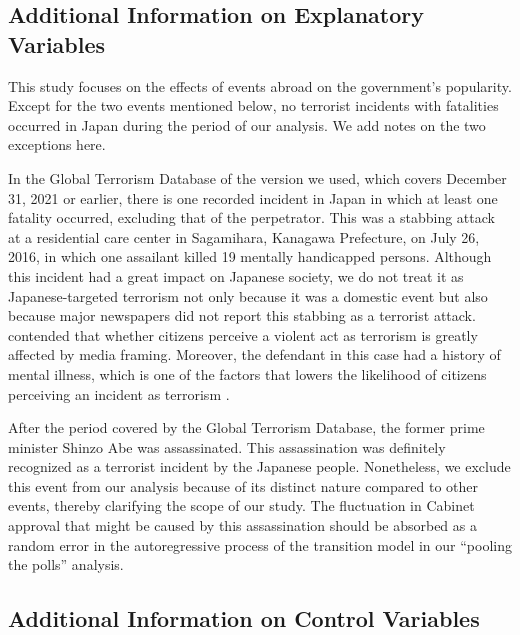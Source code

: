 \documentclass[12pt,letterpaper]{scrartcl}
\begin{document}

\normalsize
\doublespacing
\subsection{Additional Information on Explanatory Variables}\label{app:subsec:terrorism}

This study focuses on the effects of events abroad on the government's popularity. Except for the two events mentioned below, no terrorist incidents with fatalities occurred in Japan during the period of our analysis. We add notes on the two exceptions here.

In the Global Terrorism Database of the version we used, which covers December 31, 2021 or earlier, there is one recorded incident in Japan in which at least one fatality occurred, excluding that of the perpetrator. This was a stabbing attack at a residential care center in Sagamihara, Kanagawa Prefecture, on July 26, 2016, in which one assailant killed 19 mentally handicapped persons. Although this incident had a great impact on Japanese society, we do not treat it as Japanese-targeted terrorism not only because it was a domestic event but also because major newspapers did not report this stabbing as a terrorist attack. \citet{Huff2018AJPS} contended that whether citizens perceive a violent act as terrorism is greatly affected by media framing. Moreover, the defendant in this case had a history of mental illness, which is one of the factors that lowers the likelihood of citizens perceiving an incident as terrorism \citep{Huff2018AJPS}.

After the period covered by the Global Terrorism Database, the former prime minister Shinzo Abe was assassinated. This assassination was definitely recognized as a terrorist incident by the Japanese people. Nonetheless, we exclude this event from our analysis because of its distinct nature compared to other events, thereby clarifying the scope of our study. The fluctuation in Cabinet approval that might be caused by this assassination should be absorbed as a random error in the autoregressive process of the transition model in our ``pooling the polls'' analysis.

\subsection{Additional Information on Control Variables}\label{app:subsec:control}
\end{document}
